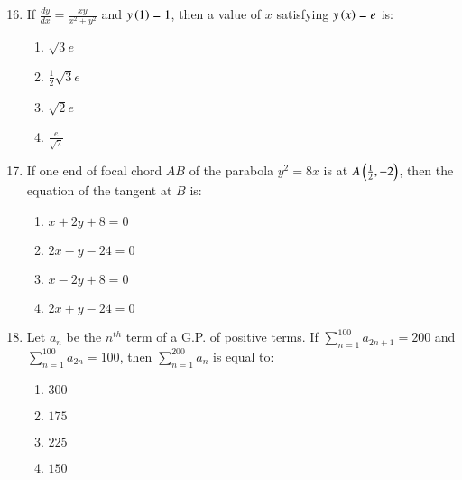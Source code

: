 \documentclass[journal]{IEEEtran}
\begin{document}
\begin{enumerate}\setcounter{enumi}{15}
    
    \item If $\frac{dy}{dx} = \frac{xy}{x^2+y^2}$ and $y\left(1\right)=1$, then a value of $x$ satisfying $y\left(x\right)=e$ is:
    \begin{multicols}{2} %
    \begin{enumerate}
        \item $\sqrt{3} e$\\
        \item $\frac{1}{2} \sqrt{3} e$\\
        \item $\sqrt{2}e$\\
        \item $\frac{e}{\sqrt{2}}$
    \end{enumerate}
    \end{multicols}

    \item If one end of focal chord $AB$ of the parabola $y^2 = 8x$ is at $A\left(\frac{1}{2},-2\right)$, then the equation of the tangent at $B$ is:
    \begin{multicols}{2}
    \begin{enumerate}
        \item $x+2y+8=0$
        \item $2x-y-24=0$
        \item $x-2y+8=0$
        \item $2x+y-24=0$
    \end{enumerate}
    \end{multicols}

    \item Let $a_n$ be the $n^{th}$ term of a G.P. of positive terms. If $\sum_{n=1}^{100} a_{2n+1} = 200$ and $\sum_{n=1}^{100}a_{2n} = 100$, then $\sum_{n=1}^{200}a_n$ is equal to:
    \begin{multicols}{2}
    \begin{enumerate}
        \item $300$\\
        \item $175$
        \item $225$\\
        \item $150$
    \end{enumerate}
    \end{multicols}


\end{enumerate}
\end{document}
